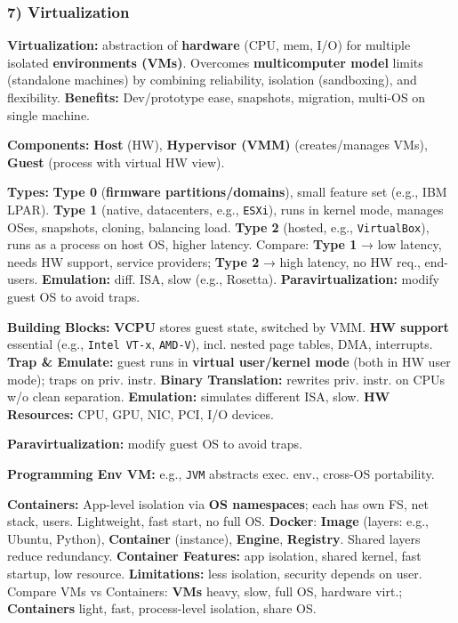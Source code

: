 \subsubsection*{7) Virtualization}
\textbf{Virtualization:} abstraction of \textbf{hardware} (CPU, mem, I/O) for multiple isolated \textbf{environments (VMs)}. Overcomes \textbf{multicomputer model} limits (standalone machines) by combining reliability, isolation (sandboxing), and flexibility. \textbf{Benefits:} Dev/prototype ease, snapshots, migration, multi-OS on single machine.

\textbf{Components:} \textbf{Host} (HW), \textbf{Hypervisor (VMM)} (creates/manages VMs), \textbf{Guest} (process with virtual HW view).

\textbf{Types:} \textbf{Type 0} (\textbf{firmware partitions/domains}), small feature set (e.g., IBM LPAR). \textbf{Type 1} (native, datacenters, e.g., \texttt{ESXi}), runs in kernel mode, manages OSes, snapshots, cloning, balancing load. \textbf{Type 2} (hosted, e.g., \texttt{VirtualBox}), runs as a process on host OS, higher latency. Compare: \textbf{Type 1} → low latency, needs HW support, service providers; \textbf{Type 2} → high latency, no HW req., end-users. \textbf{Emulation:} diff. ISA, slow (e.g., Rosetta). \textbf{Paravirtualization:} modify guest OS to avoid traps.

\textbf{Building Blocks:} \textbf{VCPU} stores guest state, switched by VMM. \textbf{HW support} essential (e.g., \texttt{Intel VT-x}, \texttt{AMD-V}), incl. nested page tables, DMA, interrupts. \textbf{Trap \& Emulate:} guest runs in \textbf{virtual user/kernel mode} (both in HW user mode); traps on priv. instr. \textbf{Binary Translation:} rewrites priv. instr. on CPUs w/o clean separation. \textbf{Emulation:} simulates different ISA, slow. \textbf{HW Resources:} CPU, GPU, NIC, PCI, I/O devices.

\textbf{Paravirtualization:} modify guest OS to avoid traps.

\textbf{Programming Env VM:} e.g., \texttt{JVM} abstracts exec. env., cross-OS portability.

\textbf{Containers:} App-level isolation via \textbf{OS namespaces}; each has own FS, net stack, users. Lightweight, fast start, no full OS. \textbf{Docker}: \textbf{Image} (layers: e.g., Ubuntu, Python), \textbf{Container} (instance), \textbf{Engine}, \textbf{Registry}. Shared layers reduce redundancy. \textbf{Container Features:} app isolation, shared kernel, fast startup, low resource. \textbf{Limitations:} less isolation, security depends on user. Compare VMs vs Containers: \textbf{VMs} heavy, slow, full OS, hardware virt.; \textbf{Containers} light, fast, process-level isolation, share OS.

